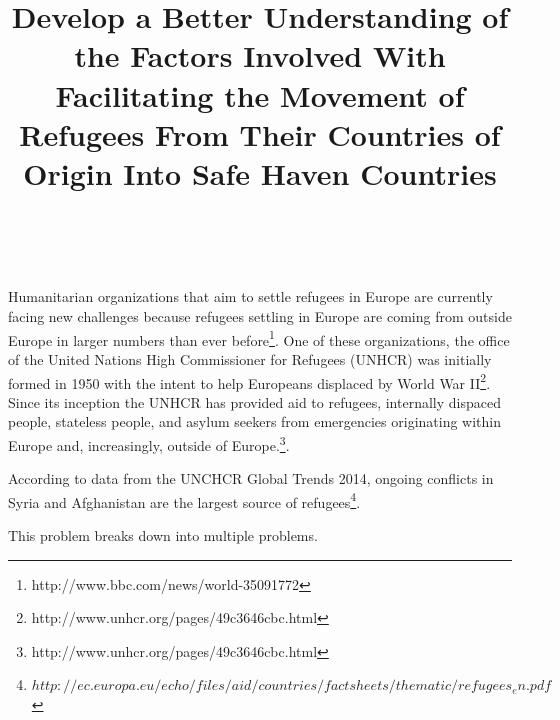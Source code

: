 \documentclass{article}
\title{Develop a Better Understanding of the Factors Involved With Facilitating the Movement of Refugees From Their Countries of Origin Into Safe Haven Countries}
\author{\ \ }
\begin{document}
\maketitle

Humanitarian organizations that aim to settle refugees in Europe are currently facing new challenges because refugees settling in Europe are coming from outside Europe in larger numbers than ever before\footnote{http://www.bbc.com/news/world-35091772}. One of these organizations, the office of the United Nations High Commissioner for Refugees (UNHCR) was initially formed in 1950 with the intent to help Europeans displaced by World War II\footnote{http://www.unhcr.org/pages/49c3646cbc.html}. Since its inception the UNHCR has provided aid to refugees, internally dispaced people, stateless people, and asylum seekers from emergencies originating within Europe and, increasingly, outside of Europe.\footnote{http://www.unhcr.org/pages/49c3646cbc.html}.

According to data from the UNCHCR Global Trends 2014, ongoing conflicts in Syria and Afghanistan are the largest source of refugees\footnote{$http://ec.europa.eu/echo/files/aid/countries/factsheets/thematic/refugees_en.pdf$}. 

This problem breaks down into multiple problems.
\end{document}
